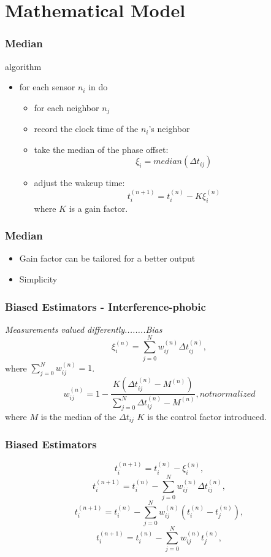 \documentclass[t]{beamer}
\begin{document}
\section{Mathematical Model}
\begin{frame}
\frametitle{Median} algorithm
 \begin{itemize}
 \item for each sensor $n_i$ in do
 \begin{itemize}
 \item    for each neighbor $n_j$
 \item    record the clock time of the $n_i$'s neighbor
 \item    take the median of the phase offset:
 \begin{equation} \xi_{i}= median( \Delta
 t_{ij})
 \end{equation}
 \item    adjust the wakeup time:
 \begin{equation}
 t_i^{(n+1)} = t_i^{(n)} - K\xi_{i}^{(n)}
 \end{equation}
where $K$ is a gain factor.
 \end{itemize}
\end{itemize}
\end{frame}
\begin{frame}
\frametitle{Median}
\begin{itemize}
\item Gain factor can be tailored for a better output \newline
\item Simplicity \newline
\end{itemize}
\end{frame}
\begin{frame}
\frametitle{Biased Estimators - Interference-phobic}
\emph{Measurements valued differently........Bias}
\begin{equation}
\xi_i^{(n)} = \sum_{j=0}^N{w_{ij}^{(n)}\Delta t_{ij}^{(n)}} ,
\end{equation}
where $\sum_{j=0}^N{w_{ij}^{(n)}= 1}$.
\begin{equation}
w_{ij}^{(n)} = 1 - \frac {K(\Delta t_{ij}^{(n)}-
M^{(n)})}{\sum_{j=0}^N \Delta t_{ij}^{(n)}-M^{(n)}}, not normalized
\end{equation} where $M$ is the median of the $\Delta t_{ij}$
\newline
$K$ is the control factor introduced.
\end{frame}
\begin{frame}
\frametitle{Biased Estimators}
\begin{equation}
t_i^{(n+1)} = t_i^{(n)} - \xi_i^{(n)} ,
\end{equation}
\begin{equation}
t_i^{(n+1)} = t_i^{(n)} - \sum_{j=0}^N{w_{ij}^{(n)}\Delta
t_{ij}^{(n)}} ,
\end{equation}
\begin{equation}
t_i^{(n+1)} = t_i^{(n)} -
\sum_{j=0}^N{w_{ij}^{(n)}(t_i^{(n)}-t_j^{(n)})} ,
\end{equation}
\begin{equation}
t_i^{(n+1)} = t_i^{(n)} - \sum_{j=0}^N{w_{ij}^{(n)}t_j^{(n)}} ,
\end{equation}
\end{frame}
\end{document}
